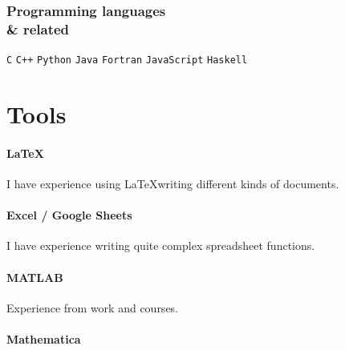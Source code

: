 \documentclass[12pt,a4paper,twocolumn]{report}
\begin{document}
\newpage
\subsubsection*{Programming languages \\ \& related}
\texttt{C}
\texttt{C++}
\texttt{Python}
\texttt{Java}
\texttt{Fortran}
\texttt{JavaScript}
\texttt{Haskell}

\section*{Tools}
\paragraph*{\LaTeX}
I have experience using \LaTeX writing different kinds of documents.

\paragraph*{Excel / Google Sheets}
I have experience writing quite complex spreadsheet functions.

\paragraph*{MATLAB}
Experience from work and courses.

\paragraph*{Mathematica}
\lipsum[1-3][5-7]
\end{document}
